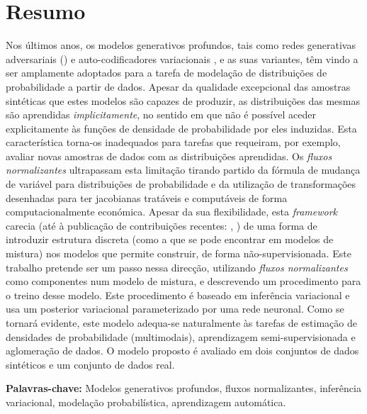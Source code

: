 \section*{Resumo}


Nos últimos anos, os modelos generativos profundos, tais como redes generativas
adversariais (\autocite{GAN}) e auto-codificadores variacionais \autocite{vaepaper},
e as suas variantes, têm vindo a ser amplamente adoptados para a tarefa de modelação
de distribuições de probabilidade a partir de dados. Apesar da qualidade excepcional das amostras sintéticas
que estes modelos são capazes de produzir, as distribuições das mesmas são aprendidas
\emph{implicitamente}, no sentido em que não é possível aceder explicitamente às funções de densidade
de probabilidade por eles induzidas. Esta característica torna-os inadequados para tarefas que
requeiram, por exemplo, avaliar novas amostras de dados com as distribuições
aprendidas. Os \emph{fluxos normalizantes} ultrapassam esta limitação tirando partido da
fórmula de mudança de variável para distribuições de probabilidade e da utilização
de transformações desenhadas para ter jacobianas tratáveis e computáveis de forma
computacionalmente económica. Apesar da sua flexibilidade, esta \emph{framework} carecia (até à publicação
de contribuições recentes: \autocite{semisuplearning_nflows}, \autocite{RAD}) de uma forma
de introduzir estrutura discreta (como a que se pode encontrar em modelos de mistura)
nos modelos que permite construir, de forma não-supervisionada. Este trabalho
pretende ser um passo nessa direcção, utilizando \emph{fluxos normalizantes} como
componentes num modelo de mistura, e descrevendo um procedimento para o treino
desse modelo. Este procedimento é baseado em inferência variacional e usa um posterior
variacional parameterizado por uma rede neuronal. Como se tornará evidente, este
modelo adequa-se naturalmente às tarefas de estimação de densidades de probabilidade (multimodais),
aprendizagem semi-supervisionada e aglomeração de dados. O modelo proposto é
avaliado em dois conjuntos de dados sintéticos e um conjunto de dados real.
\vfill

\textbf{\Large Palavras-chave:} Modelos generativos profundos, fluxos normalizantes,
inferência variacional, modelação probabilística, aprendizagem automática.
